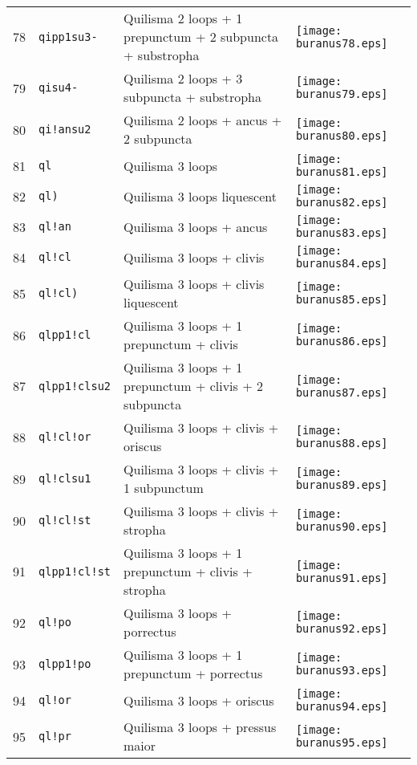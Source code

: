 \documentclass{scrarticle}
\begin{document}
\begin{longtable}{l|l|l|l}
78 & \texttt{qipp1su3-} & Quilisma 2 loops + 1 prepunctum + 2 subpuncta + substropha & \texttt{[image: buranus78.eps]} \\
79 & \texttt{qisu4-} & Quilisma 2 loops + 3 subpuncta + substropha & \texttt{[image: buranus79.eps]} \\
80 & \texttt{qi!ansu2} & Quilisma 2 loops + ancus + 2 subpuncta & \texttt{[image: buranus80.eps]} \\
81 & \texttt{ql} & Quilisma 3 loops & \texttt{[image: buranus81.eps]} \\
82 & \texttt{ql)} & Quilisma 3 loops liquescent & \texttt{[image: buranus82.eps]} \\
83 & \texttt{ql!an} & Quilisma 3 loops + ancus & \texttt{[image: buranus83.eps]} \\
84 & \texttt{ql!cl} & Quilisma 3 loops + clivis & \texttt{[image: buranus84.eps]} \\
85 & \texttt{ql!cl)} & Quilisma 3 loops + clivis liquescent & \texttt{[image: buranus85.eps]} \\
86 & \texttt{qlpp1!cl} & Quilisma 3 loops + 1 prepunctum + clivis & \texttt{[image: buranus86.eps]} \\
87 & \texttt{qlpp1!clsu2} & Quilisma 3 loops + 1 prepunctum + clivis + 2 subpuncta & \texttt{[image: buranus87.eps]} \\
88 & \texttt{ql!cl!or} & Quilisma 3 loops + clivis + oriscus & \texttt{[image: buranus88.eps]} \\
89 & \texttt{ql!clsu1} & Quilisma 3 loops + clivis + 1 subpunctum & \texttt{[image: buranus89.eps]} \\
90 & \texttt{ql!cl!st} & Quilisma 3 loops + clivis + stropha & \texttt{[image: buranus90.eps]} \\
91 & \texttt{qlpp1!cl!st} & Quilisma 3 loops + 1 prepunctum + clivis + stropha & \texttt{[image: buranus91.eps]} \\
92 & \texttt{ql!po} & Quilisma 3 loops + porrectus & \texttt{[image: buranus92.eps]} \\
93 & \texttt{qlpp1!po} & Quilisma 3 loops + 1 prepunctum + porrectus & \texttt{[image: buranus93.eps]} \\
94 & \texttt{ql!or} & Quilisma 3 loops + oriscus & \texttt{[image: buranus94.eps]} \\
95 & \texttt{ql!pr} & Quilisma 3 loops + pressus maior & \texttt{[image: buranus95.eps]} \\

\end{longtable}
\end{document}

